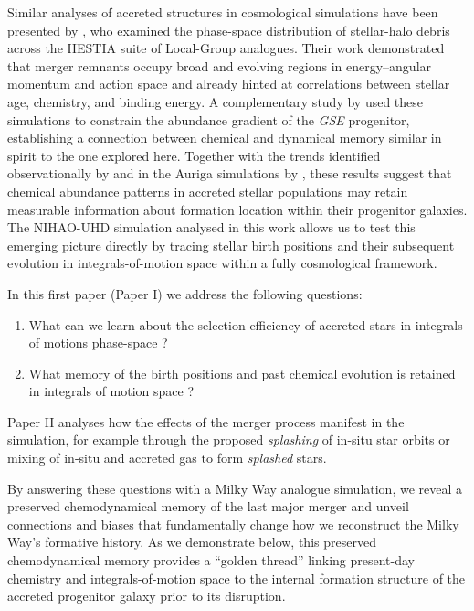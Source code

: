 \documentclass[fleqn,usenatbib]{mnras}
\newcommand{\changed}[1]{{{#1}}}
\begin{document}
\changed{Similar analyses of accreted structures in cosmological simulations have been presented by \citet{Khoperskov2023d,Khoperskov2023b}, who examined the phase-space distribution of stellar-halo debris across the HESTIA suite of Local-Group analogues. Their work demonstrated that merger remnants occupy broad and evolving regions in energy--angular momentum and action space and already hinted at correlations between stellar age, chemistry, and binding energy. A complementary study by \citet{Khoperskov2023c} used these simulations to constrain the abundance gradient of the \textit{GSE} progenitor, establishing a connection between chemical and dynamical memory similar in spirit to the one explored here. Together with the trends identified observationally by \citet{Skuladottir2025} and in the Auriga simulations by \citet{Carrillo2026}, these results suggest that chemical abundance patterns in accreted stellar populations may retain measurable information about formation location within their progenitor galaxies. The NIHAO-UHD simulation analysed in this work allows us to test this emerging picture directly by tracing stellar birth positions and their subsequent evolution in integrals-of-motion space within a fully cosmological framework.}

In this first paper (Paper I) we address the following questions: 
\begin{enumerate}[leftmargin=2em,labelwidth=0em]
    \item What can we learn about the selection efficiency of accreted stars in integrals of motions phase-space \citep{Helmi2018, Feuillet2021, Buder2022, Monty2024}?
    \item What memory of the birth positions and past chemical evolution is retained in integrals of motion space \citep{Skuladottir2025}?
\end{enumerate}

Paper II \citep{Buder2025d} analyses how the effects of the merger process manifest in the simulation, for example through the proposed \textit{splashing} of in-situ star orbits \citep{Belokurov2020} or mixing of in-situ and accreted gas to form \textit{splashed} stars.

By answering these questions with a Milky Way analogue simulation, we reveal a preserved chemodynamical memory of the last major merger and unveil connections and biases that fundamentally change how we reconstruct the Milky Way's formative history. \changed{As we demonstrate below, this preserved chemodynamical memory provides a ``golden thread'' linking present-day chemistry and integrals-of-motion space to the internal formation structure of the accreted progenitor galaxy prior to its disruption.}
\end{document}
